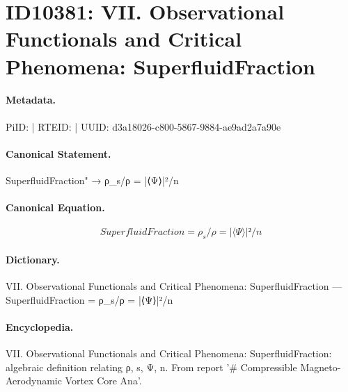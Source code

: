 \section*{ID10381: VII. Observational Functionals and Critical Phenomena: SuperfluidFraction}
\paragraph{Metadata.}
PiID:  | RTEID:  | UUID: d3a18026-c800-5867-9884-ae9ad2a7a90e

\paragraph{Canonical Statement.}
SuperfluidFraction" → ρ\_s/ρ = |⟨Ψ⟩|²/n

\paragraph{Canonical Equation.}
\[
SuperfluidFraction = ρ_s/ρ = |⟨Ψ⟩|²/n
\]

\paragraph{Dictionary.}
VII. Observational Functionals and Critical Phenomena: SuperfluidFraction — SuperfluidFraction = ρ\_s/ρ = |⟨Ψ⟩|²/n

\paragraph{Encyclopedia.}
VII. Observational Functionals and Critical Phenomena: SuperfluidFraction: algebraic definition relating ρ, s, Ψ, n. From report '\# Compressible Magneto-Aerodynamic Vortex Core Ana'.
